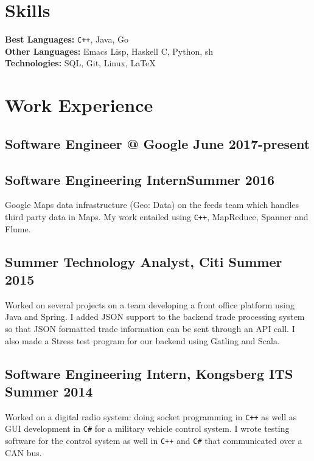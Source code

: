 \documentclass[5pt]{resume}
\begin{document}


{\color{titleColor}\section{Skills}}
\noindent\textbf{Best Languages:} {\color{default} \verb!C++!, Java, Go }\\
\textbf{Other Languages:} {\color{default} Emacs Lisp, Haskell C, Python, sh} \\
\textbf{Technologies:} {\color{default} SQL, Git, Linux, \LaTeX } 


{\color{titleColor} \section{Work Experience}}

\subsection{\textbf{Software Engineer @ Google \hfill June 2017-present}}
\subsection{\textbf{Software Engineering Intern\hfill Summer 2016}}
{\color{default} Google Maps data infrastructure (Geo: Data) on the
  feeds team which handles third party data in Maps. 
My work entailed using \verb!C++!, MapReduce, Spanner and Flume.  }

\subsection{\textbf{Summer Technology Analyst, Citi \hfill Summer 2015}} 
{\color{default} Worked on several projects on a team developing a front office
  platform using Java and Spring. I added JSON support to the backend trade
  processing system so that JSON formatted trade information can be sent through
  an API call. I also made a Stress test program for our backend using Gatling
  and Scala.}

\subsection{\textbf{Software Engineering Intern, Kongsberg ITS \hfill Summer 2014}}
{\color{default} Worked on a digital radio system: doing socket programming in
  \verb!C++! as well as GUI development in \verb!C#! for a military vehicle control system. I
  wrote testing software for the control system as well in \verb!C++! and \verb!C#! that
  communicated over a CAN bus.  }
\end{document}
